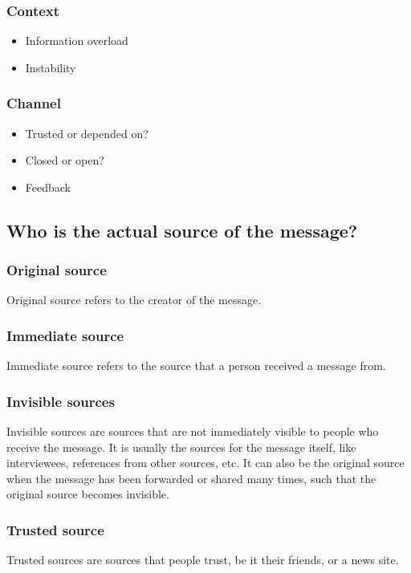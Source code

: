 \documentclass[11pt]{article}
\begin{document}
\subsubsection{Context}
\label{sec:org4bd2849}
\begin{itemize}
\item Information overload
\item Instability
\end{itemize}
\subsubsection{Channel}
\label{sec:org156bc13}
\begin{itemize}
\item Trusted or depended on?
\item Closed or open?
\item Feedback
\end{itemize}
\subsection{Who is the actual source of the message?}
\label{sec:org1bcc1b5}

\subsubsection{Original source}
\label{sec:org54deee4}
Original source refers to the creator of the message.
\subsubsection{Immediate source}
\label{sec:org7b91618}
Immediate source refers to the source that a person received a message from.
\subsubsection{Invisible sources}
\label{sec:org0472ebf}
Invisible sources are sources that are not immediately visible to people who receive the message. It is usually the sources for the message itself, like interviewees, references from other sources, etc. It can also be the original source when the message has been forwarded or shared many times, such that the original source becomes invisible.
\subsubsection{Trusted source}
\label{sec:orgac27004}
Trusted sources are sources that people trust, be it their friends, or a news site.
\end{document}
